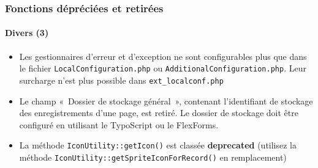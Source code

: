 \begin{frame}[fragile]
	\frametitle{Fonctions dépréciées et retirées}
	\framesubtitle{Divers (3)}

	\begin{itemize}

		\item Les gestionnaires d'erreur et d'exception ne sont configurables plus que dans le fichier
			\texttt{LocalConfiguration.php} ou \texttt{AdditionalConfiguration.php}. Leur surcharge n'est plus
			possible dans \texttt{ext\_localconf.php}

		\item Le champ «~Dossier de stockage général~», contenant l'identifiant de stockage des enregistrements
			d'une page, est retiré.
			Le dossier de stockage doit être configuré en utilisant le TypoScript ou le FlexForms.

		\item La méthode \texttt{IconUtility::getIcon()} est classée \textbf{deprecated} (utilisez
			la méthode \texttt{IconUtility::getSpriteIconForRecord()} en remplacement)

	\end{itemize}

\end{frame}

